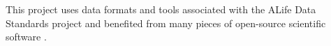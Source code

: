 This project uses data formats and tools associated with the ALife Data Standards project \citep{lalejini2019data} and benefited from many pieces of open-source scientific software \citep{sand2014tqdist,2020SciPy-NMeth,harris2020array,reback2020pandas,mckinney-proc-scipy-2010,sukumaran2010dendropy,cock2009biopython,torchiano2016effsize,waskom2021seaborn,hunter2007matplotlib,moreno2024apc,moreno2024qspool,moreno2023teeplot,hagen2021gen3sis,torchiano2016effsize}.
